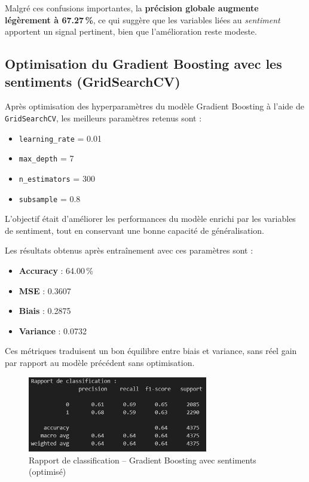 \documentclass[a4paper,12pt]{article}
\begin{document}
Malgré ces confusions importantes, la \textbf{précision globale augmente légèrement à 67.27\,\%}, ce qui suggère que les variables liées au \textit{sentiment} apportent un signal pertinent, bien que l'amélioration reste modeste.


\subsection{Optimisation du Gradient Boosting avec les sentiments (GridSearchCV)}

Après optimisation des hyperparamètres du modèle Gradient Boosting à l’aide de \texttt{GridSearchCV}, les meilleurs paramètres retenus sont :
\begin{itemize}
    \item \texttt{learning\_rate} = 0.01
    \item \texttt{max\_depth} = 7
    \item \texttt{n\_estimators} = 300
    \item \texttt{subsample} = 0.8
\end{itemize}

L’objectif était d’améliorer les performances du modèle enrichi par les variables de sentiment, tout en conservant une bonne capacité de généralisation. 

Les résultats obtenus après entraînement avec ces paramètres sont :
\begin{itemize}
    \item \textbf{Accuracy} : 64.00\,\%
    \item \textbf{MSE} : 0.3607
    \item \textbf{Biais} : 0.2875
    \item \textbf{Variance} : 0.0732
\end{itemize}

Ces métriques traduisent un bon équilibre entre biais et variance, sans réel gain par rapport au modèle précédent sans optimisation.

\begin{figure}[H]
    \centering
    \includegraphics[width=0.7\textwidth]{classification_sentiment_gridsearch.png}
    \caption{Rapport de classification -- Gradient Boosting avec sentiments (optimisé)}
    \label{fig:classification_sentiment_gridsearch}
\end{figure}
\end{document}
